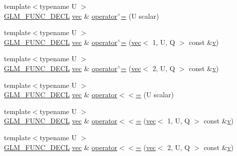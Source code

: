 \begin{DoxyCompactItemize}
\item 
{\footnotesize template$<$typename U $>$ }\\\hyperlink{setup_8hpp_ab2d052de21a70539923e9bcbf6e83a51}{G\+L\+M\+\_\+\+F\+U\+N\+C\+\_\+\+D\+E\+CL} \hyperlink{structglm_1_1vec}{vec} \& \hyperlink{structglm_1_1vec_3_012_00_01_t_00_01_q_01_4_af112affb46b25559da949c6247850d8d}{operator$^\wedge$=} (U scalar)
\item 
{\footnotesize template$<$typename U $>$ }\\\hyperlink{setup_8hpp_ab2d052de21a70539923e9bcbf6e83a51}{G\+L\+M\+\_\+\+F\+U\+N\+C\+\_\+\+D\+E\+CL} \hyperlink{structglm_1_1vec}{vec} \& \hyperlink{structglm_1_1vec_3_012_00_01_t_00_01_q_01_4_a78bce23dda849b6e10228af66f698597}{operator$^\wedge$=} (\hyperlink{structglm_1_1vec}{vec}$<$ 1, U, Q $>$ const \&\hyperlink{_s_d_l__opengl_8h_a10a82eabcb59d2fcd74acee063775f90}{v})
\item 
{\footnotesize template$<$typename U $>$ }\\\hyperlink{setup_8hpp_ab2d052de21a70539923e9bcbf6e83a51}{G\+L\+M\+\_\+\+F\+U\+N\+C\+\_\+\+D\+E\+CL} \hyperlink{structglm_1_1vec}{vec} \& \hyperlink{structglm_1_1vec_3_012_00_01_t_00_01_q_01_4_aee4803e0202a355622479781010b203b}{operator$^\wedge$=} (\hyperlink{structglm_1_1vec}{vec}$<$ 2, U, Q $>$ const \&\hyperlink{_s_d_l__opengl_8h_a10a82eabcb59d2fcd74acee063775f90}{v})
\item 
{\footnotesize template$<$typename U $>$ }\\\hyperlink{setup_8hpp_ab2d052de21a70539923e9bcbf6e83a51}{G\+L\+M\+\_\+\+F\+U\+N\+C\+\_\+\+D\+E\+CL} \hyperlink{structglm_1_1vec}{vec} \& \hyperlink{structglm_1_1vec_3_012_00_01_t_00_01_q_01_4_ad7b07e1346a5e808343241891129d11e}{operator$<$$<$=} (U scalar)
\item 
{\footnotesize template$<$typename U $>$ }\\\hyperlink{setup_8hpp_ab2d052de21a70539923e9bcbf6e83a51}{G\+L\+M\+\_\+\+F\+U\+N\+C\+\_\+\+D\+E\+CL} \hyperlink{structglm_1_1vec}{vec} \& \hyperlink{structglm_1_1vec_3_012_00_01_t_00_01_q_01_4_a8ab9f3c08e3bcd5376f5852b15069a43}{operator$<$$<$=} (\hyperlink{structglm_1_1vec}{vec}$<$ 1, U, Q $>$ const \&\hyperlink{_s_d_l__opengl_8h_a10a82eabcb59d2fcd74acee063775f90}{v})
\item 
{\footnotesize template$<$typename U $>$ }\\\hyperlink{setup_8hpp_ab2d052de21a70539923e9bcbf6e83a51}{G\+L\+M\+\_\+\+F\+U\+N\+C\+\_\+\+D\+E\+CL} \hyperlink{structglm_1_1vec}{vec} \& \hyperlink{structglm_1_1vec_3_012_00_01_t_00_01_q_01_4_a6ddb083ba5a5c11f378fb85c8842cc9c}{operator$<$$<$=} (\hyperlink{structglm_1_1vec}{vec}$<$ 2, U, Q $>$ const \&\hyperlink{_s_d_l__opengl_8h_a10a82eabcb59d2fcd74acee063775f90}{v})

\end{DoxyCompactItemize}
